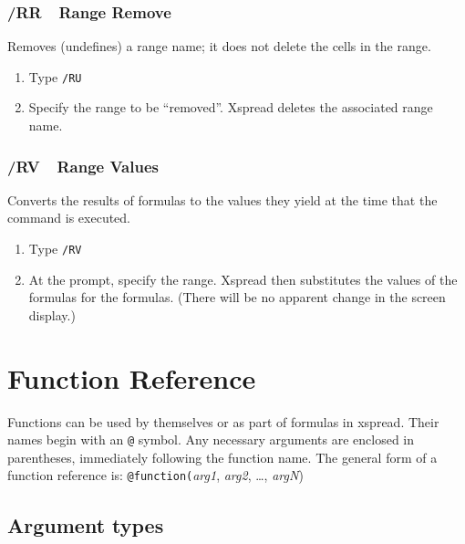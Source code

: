 \documentclass[titlepage]{article}
\begin{document}
\subsubsection{/RR\ \      Range Remove}

Removes (undefines) a range name; it does not delete the cells in the
range.

\usage{}
\begin{enumerate}\itemsep -2pt
\item Type \texttt{/RU}
\item Specify the range to be ``removed''.  \textsf{Xspread} deletes
  the associated range name.
\end{enumerate}

\subsubsection{/RV\ \      Range Values}

Converts the results of formulas to the values they yield at
the time that the command is executed.

\usage{}
\begin{enumerate}\itemsep -2pt
\item Type \texttt{/RV}
\item At the prompt, specify the range.  \textsf{Xspread} then
  substitutes the values of the formulas for the formulas.  (There will
  be no apparent change in the screen display.)
\end{enumerate}

\section{Function Reference}
\label{sec:funref}

Functions can be used by themselves or as part of formulas in
\textsf{xspread}.  Their names begin with an \texttt{@} symbol.  Any
necessary arguments are enclosed in parentheses, immediately following
the function name.  The general form of a function reference is:
  \texttt{@function(}\textit{arg1}, \textit{arg2}, \ldots,
  \textit{argN})

\subsection{Argument types}
\end{document}
